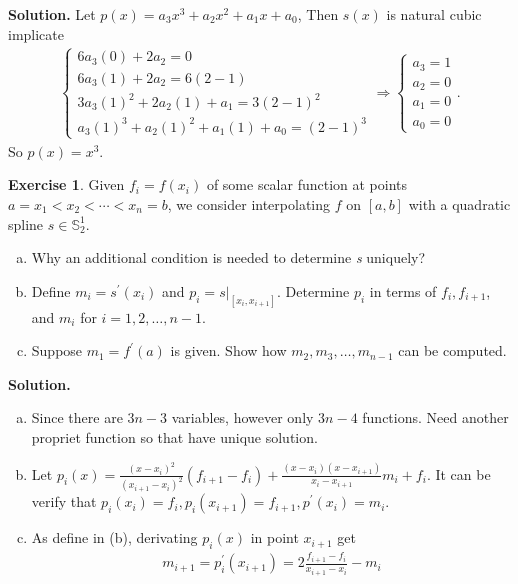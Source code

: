\documentclass[a4paper]{book}
\newenvironment{solution}%
{\noindent\textbf{Solution.}}%
{\qedhere}
\numberwithin{equation}{chapter}
\theoremstyle{definition}
\newtheorem{exc}[exm]{Exercise}
\begin{document}
\begin{solution}
  Let $p(x) = a_3 x^3 + a_2 x^2 + a_1 x + a_0$, Then $s(x)$ is natural cubic implicate
  \begin{align*}
    \begin{cases}
      6 a_3 (0) + 2 a_2 = 0 \\
      6 a_3 (1) + 2 a_2 = 6 (2 -1) \\
      3 a_3 (1)^2 + 2 a_2 (1) + a_1 = 3(2 - 1)^2 \\
      a_3 (1)^3 + a_2 (1)^2 + a_1 (1) + a_0 = (2 - 1)^3
    \end{cases} \Longrightarrow
    \begin{cases}
      a_3 = 1 \\
      a_2 = 0 \\
      a_1 = 0\\
      a_0 = 0
    \end{cases}.
  \end{align*}
  So $p(x) = x^3$.
\end{solution}

\begin{exc}
  Given $f_i = f(x_i)$ of some scalar function at points $a = x_1 < x_2 < \cdots < x_n = b$, we consider interpolating $f$ on $[a,b]$ with a quadratic spline $s \in \mathbb{S}_2^1$.
  \begin{enumerate}[(a)]
  \item Why an additional condition is needed to determine \textit{s} uniquely?

  \item Define $m_i = s^\prime(x_i)$ and $p_i = \left. s \right|_{[x_i,x_{i+1}]}$. Determine $p_i$ in terms of $f_i,f_{i+1}$, and $m_i$ for $i = 1,2, \ldots ,n-1$.

  \item Suppose $m_1 = f^\prime(a)$ is given. Show how $m_2,m_3, \ldots, m_{n-1}$ can be computed.
    
  \end{enumerate}
\end{exc}

\begin{solution}
  \begin{enumerate}[(a)]
  \item Since there are $3n-3$ variables, however only $3n - 4$ functions. Need another propriet function so that have unique solution.

  \item Let $p_i(x) = \frac{(x - x_i)^2}{(x_{i+1} - x_i)^2}(f_{i+1} - f_i)+ \frac{(x - x_i)(x - x_{i+1})}{x_i - x_{i+1}}m_i + f_i$. It can be verify that $p_i(x_i) = f_i,p_i(x_{i+1}) = f_{i+1}, p^\prime(x_i) = m_i$.

  \item As define in (b), derivating $p_i(x)$ in point $x_{i+1}$ get
    \begin{align*}
      m_{i+1} = p_i^\prime(x_{i+1}) = 2 \frac{f_{i+1}- f_i}{x_{i+1}- x_i} - m_i
    \end{align*}
  \end{enumerate}
\end{solution}
\end{document}
